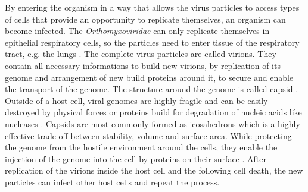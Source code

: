 By entering the organism in a way that allows the virus particles to access types of cells that provide an opportunity to replicate themselves, an %
organism can become infected. The \textit{Orthomyxoviridae} can only replicate themselves in epithelial respiratory cells, so the particles need to enter tissue of the respiratory tract, e.g. the lungs \autocite{infection}. The complete virus particles are called virions. They contain all necessary informations to build new virions, by replication of its genome and arrangement of new build proteins around it, to secure and enable the transport of the genome. The structure around the genome is called capsid \autocite{buch}. Outside of a host cell, viral genomes are highly fragile and can be easily destroyed by physical forces or proteins build for degradation of nucleic acids like nucleases \autocite{buch}. Capsids are most commonly formed as icosahedrons which is a highly effective trade-off between stability, volume and surface area. While protecting the genome from the hostile environment around the cells, they enable the injection of the genome into the cell by proteins on their surface \autocite{buch}. After replication of the virions inside the host cell and the following cell death, the new particles can infect other host cells and repeat the process.

